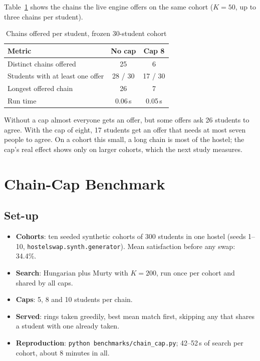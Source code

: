 Table~\ref{tab:demo-offers} shows the chains the live engine offers on
the same cohort ($K = 50$, up to three chains per student).

\begin{table}[H]
\centering
\begin{tabular}{lcc}
\toprule
\textbf{Metric} & \textbf{No cap} & \textbf{Cap 8} \\
\midrule
Distinct chains offered & 25 & 6 \\
Students with at least one offer & 28 / 30 & 17 / 30 \\
Longest offered chain & 26 & 7 \\
Run time & 0.06\,s & 0.05\,s \\
\bottomrule
\end{tabular}
\caption{Chains offered per student, frozen 30-student cohort}
\label{tab:demo-offers}
\end{table}

Without a cap almost everyone gets an offer, but some offers ask 26
students to agree. With the cap of eight, 17 students get an offer that
needs at most seven people to agree. On a cohort this small, a long
chain is most of the hostel; the cap's real effect shows only on larger
cohorts, which the next study measures.

\section{Chain-Cap Benchmark}
\label{sec:chain-cap}

\subsection{Set-up}

\begin{itemize}
  \item \textbf{Cohorts}: ten seeded synthetic cohorts of 300 students in
  one hostel (seeds 1--10, \texttt{hostelswap.synth.generator}). Mean
  satisfaction before any swap: 34.4\%.
  \item \textbf{Search}: Hungarian plus Murty with $K = 200$, run once
  per cohort and shared by all caps.
  \item \textbf{Caps}: 5, 8 and 10 students per chain.
  \item \textbf{Served}: rings taken greedily, best mean match first,
  skipping any that shares a student with one already taken.
  \item \textbf{Reproduction}: \texttt{python benchmarks/chain\_cap.py};
  42--52\,s of search per cohort, about 8 minutes in all.
\end{itemize}

